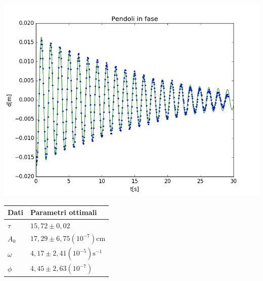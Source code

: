 \documentclass{exam}
\begin{document}
		\begin{minipage}{0.5\textwidth}
			\includegraphics[width=\textwidth]{fase}
			\end{minipage}
		\begin{minipage}{0.5\textwidth}
			\begin{tabular}{ll}
				\toprule
				Dati & Parametri ottimali \\
				\midrule
				$\tau$ & $15,72 \pm 0,02$ \\
				$A_{0}$ & $17,29 \pm 6,75(10^{-7})$cm\\
				$\omega$ & $4,17 \pm 2,41(10^{-5})\textrm{s}^{-1}$\\			
				$\phi$ & $4,45 \pm 2,63(10^{-7})$\\
				\bottomrule
			\end{tabular}
		\end{minipage}
\end{document}
